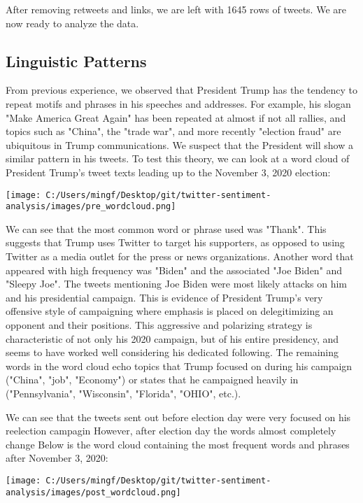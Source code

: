 \documentclass[11pt]{article} %
\begin{document}
After removing retweets and links, we are left with 1645 rows of tweets. We are now ready to analyze the data.

\subsection{Linguistic Patterns}

From previous experience, we observed that President Trump has the tendency to repeat motifs and phrases in his speeches and addresses.
For example, his slogan "Make America Great Again" has been repeated at almost if not all rallies, and topics such as "China", the "trade war", and more recently "election fraud" are ubiquitous in Trump communications.
We suspect that the President will show a similar pattern in his tweets.
To test this theory, we can look at a word cloud of President Trump's tweet texts leading up to the November 3, 2020 election:

\begin{center}
    \texttt{[image: C:/Users/mingf/Desktop/git/twitter-sentiment-analysis/images/pre\_wordcloud.png]}
\end{center}

We can see that the most common word or phrase used was "Thank".
This suggests that Trump uses Twitter to target his supporters, as opposed to using Twitter as a media outlet for the press or news organizations.
Another word that appeared with high frequency was "Biden" and the associated "Joe Biden" and "Sleepy Joe".
The tweets mentioning Joe Biden were most likely attacks on him and his presidential campaign.
This is evidence of President Trump's very offensive style of campaigning where emphasis is placed on delegitimizing an opponent and their positions.
This aggressive and polarizing strategy is characteristic of not only his 2020 campaign, but of his entire presidency, and seems to have worked well considering his dedicated following.
The remaining words in the word cloud echo topics that Trump focused on during his campaign ("China", "job", "Economy") or states that he campaigned heavily in ("Pennsylvania", "Wisconsin", "Florida", "OHIO", etc.).

We can see that the tweets sent out before election day were very focused on his reelection campagin
However, after election day the words almost completely change
Below is the word cloud containing the most frequent words and phrases after November 3, 2020:

\begin{center}
    \texttt{[image: C:/Users/mingf/Desktop/git/twitter-sentiment-analysis/images/post\_wordcloud.png]}
\end{center}
\end{document}
